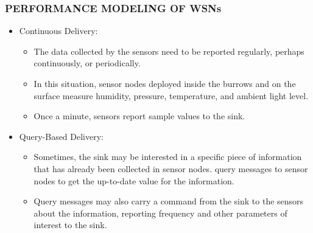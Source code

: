 \documentclass[11pt]{beamer}
\begin{document}
			\begin{frame}
				\frametitle{PERFORMANCE MODELING OF WSNs}
				\begin{itemize}
					\item Continuous Delivery:
					\begin{itemize}
						\item The data collected by the sensors need to be reported regularly, perhaps continuously, or periodically. 
						\item In this situation, sensor nodes deployed inside the burrows and on the surface measure humidity, pressure, temperature, and ambient light level. 
						\item Once a minute, sensors report sample values to the sink.
					\end{itemize}
					\item Query-Based Delivery:
					 \begin{itemize}
					 	\item Sometimes, the sink may be interested in a specific piece of information that has already been collected in sensor nodes.
					 	query messages to sensor nodes to get the up-to-date value for the information.
					 	\item Query messages may also carry a command from the sink to the sensors about the information, reporting frequency and other parameters of interest to the sink.
					 \end{itemize}
				\end{itemize}
				\end{frame}
\end{document}
